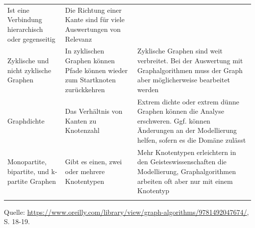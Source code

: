\documentclass[ngerman,]{scrreprt}
\begin{document}
\begin{longtable}[]{@{}lll@{}}
\begin{minipage}[t]{0.26\columnwidth}
Ist eine Verbindung hierarchisch oder gegenseitig\strut
\end{minipage} & \begin{minipage}[t]{0.44\columnwidth}\raggedright
Die Richtung einer Kante sind für viele Auswertungen von Relevanz\strut
\end{minipage}\tabularnewline
\begin{minipage}[t]{0.22\columnwidth}\raggedright
Zyklische und nicht zyklische Graphen\strut
\end{minipage} & \begin{minipage}[t]{0.26\columnwidth}\raggedright
In zyklischen Graphen können Pfade können wieder zum Startknoten zurückkehren\strut
\end{minipage} & \begin{minipage}[t]{0.44\columnwidth}\raggedright
Zyklische Graphen sind weit verbreitet. Bei der Auswertung mit Graphalgorithmen muss der Graph aber möglicherweise bearbeitet werden\strut
\end{minipage}\tabularnewline
\begin{minipage}[t]{0.22\columnwidth}\raggedright
Graphdichte\strut
\end{minipage} & \begin{minipage}[t]{0.26\columnwidth}\raggedright
Das Verhältnis von Kanten zu Knotenzahl\strut
\end{minipage} & \begin{minipage}[t]{0.44\columnwidth}\raggedright
Extrem dichte oder extrem dünne Graphen können die Analyse erschweren. Ggf. können Änderungen an der Modellierung helfen, sofern es die Domäne zulässt\strut
\end{minipage}\tabularnewline
\begin{minipage}[t]{0.22\columnwidth}\raggedright
Monopartite, bipartite, und k-partite Graphen\strut
\end{minipage} & \begin{minipage}[t]{0.26\columnwidth}\raggedright
Gibt es einen, zwei oder mehrere Knotentypen\strut
\end{minipage} & \begin{minipage}[t]{0.44\columnwidth}\raggedright
Mehr Knotentypen erleichtern in den Geisteswissenschaften die Modellierung, Graphalgorithmen arbeiten oft aber nur mit einem Knotentyp\strut
\end{minipage}\tabularnewline
\bottomrule
\label{tab:charaktertyp}
\end{longtable}

Quelle: \href{Needham/Hodler\%202019}{https://www.oreilly.com/library/view/graph-algorithms/9781492047674/}, S. 18-19.
\end{document}
